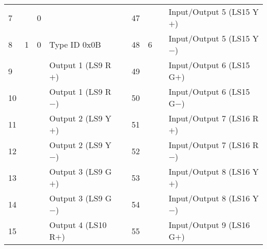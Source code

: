 \documentclass[]{article}
\begin{document}
\begin{landscape}
\begin{table}[ht]
\begin{tabular}{lllllllll}
			7            &                     & 0                  &                                &                    & 47                       &                                            &                                            & Input/Output 5 (LS15 Y$+$)                \\
			8            & \multirow{-8}{*}{1} & 0                  & \multirow{-8}{*}{Type ID 0x0B} & \multirow{-9}{*}{} & 48                       & \multirow{-8}{*}{6}                        & \multirow{-8}{*}{}                        & Input/Output 5 (LS15 Y$-$)                \\ \cline{1-4} \cline{6-9} 
			9            &                     &                    & Output 1 (LS9 R$+$)            &                    & 49                       &                                            &                                            & Input/Output 6 (LS15 G$+$)                \\
			10           &                     &                    & Output 1 (LS9 R$-$)            &                    & 50                       &                                            &                                            & Input/Output 6 (LS15 G$-$)                \\
			11           &                     &                    & Output 2 (LS9 Y$+$)            &                    & 51                       &                                            &                                            & Input/Output 7 (LS16 R$+$)                \\
			12           &                     &                    & Output 2 (LS9 Y$-$)            &                    & 52                       &                                            &                                            & Input/Output 7 (LS16 R$-$)                \\
			13           &                     &                    & Output 3 (LS9 G$+$)            &                    & 53                       &                                            &                                            & Input/Output 8 (LS16 Y$+$)                \\
			14           &                     &                    & Output 3 (LS9 G$-$)            &                    & 54                       &                                            &                                            & Input/Output 8 (LS16 Y$-$)                \\
			15           &                     &                    & Output 4 (LS10 R$+$)           &                    & 55                       &                                            &                                            & Input/Output 9 (LS16 G$+$)                \\

\end{tabular}
\end{table}
\end{landscape}
\end{document}
